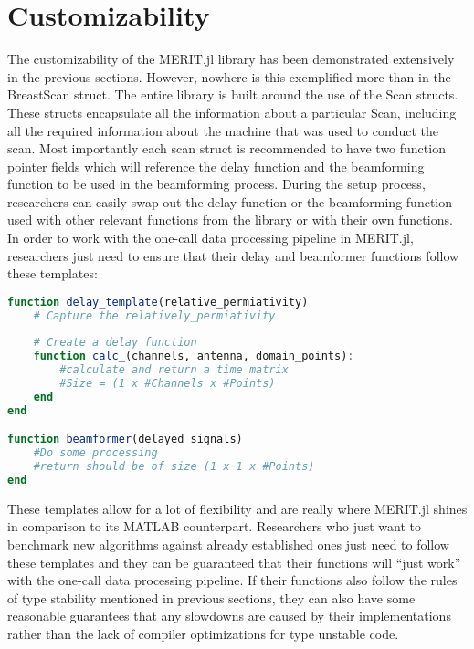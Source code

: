 \section{Customizability}
The customizability of the MERIT.jl library has been demonstrated extensively in the previous sections. However, nowhere
is this exemplified more than in the BreastScan struct. The entire library is built around the use of the Scan structs.
These structs encapsulate all the information about a particular Scan, including all the required information about the
machine that was used to conduct the scan. Most importantly each scan struct is recommended to have two function pointer
fields which will reference the delay function and the beamforming function to be used in the beamforming process.
During the setup process, researchers can easily swap out the delay function or the beamforming function used with other
relevant functions from the library or with their own functions. In order to work with the one-call data processing
pipeline in MERIT.jl, researchers just need to ensure that their delay and beamformer functions follow these templates:
\begin{lstlisting}[language=Julia]
function delay_template(relative_permiativity)
    # Capture the relatively_permiativity
    
    # Create a delay function
    function calc_(channels, antenna, domain_points):
        #calculate and return a time matrix
        #Size = (1 x #Channels x #Points)
    end
end

function beamformer(delayed_signals)
    #Do some processing
    #return should be of size (1 x 1 x #Points)
end
\end{lstlisting}
These templates allow for a lot of flexibility and are really where MERIT.jl shines in comparison to its MATLAB
counterpart. Researchers who just want to benchmark new algorithms against already established ones just need to follow
these templates and they can be guaranteed that their functions will ``just work'' with the one-call data processing
pipeline. If their functions also follow the rules of type stability mentioned in previous sections, they can also have
some reasonable guarantees that any slowdowns are caused by their implementations rather than the lack of compiler
optimizations for type unstable code.

